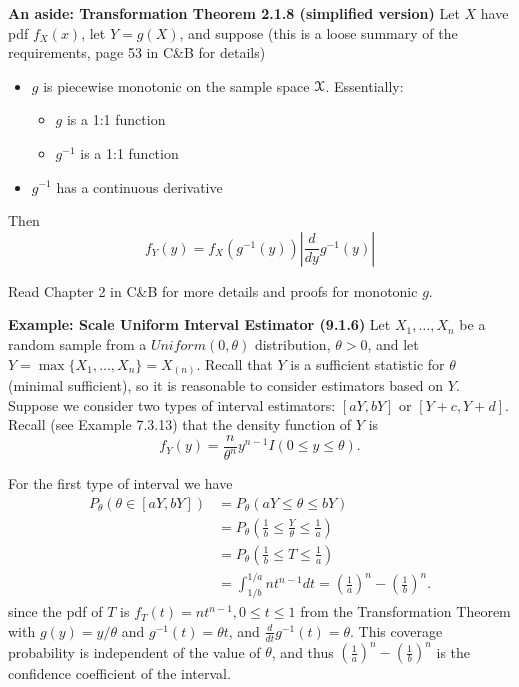 \documentclass[11pt,]{article}
\providecommand{\tightlist}{%
  \setlength{\itemsep}{0pt}\setlength{\parskip}{0pt}}
\newcommand{\Xndots}{X_1, \ldots, X_n}
\def\Xsc{{\cal X}}
\begin{document}
\textbf{An aside: Transformation Theorem 2.1.8 (simplified version)} Let
\(X\) have pdf \(f_X(x)\), let \(Y=g(X)\), and suppose (this is a loose
summary of the requirements, page 53 in C\&B for details)

\begin{itemize}
\tightlist
\item
  \(g\) is piecewise monotonic on the sample space \(\Xsc\).
  Essentially:

  \begin{itemize}
  \tightlist
  \item
    \(g\) is a 1:1 function
  \item
    \(g^{-1}\) is a 1:1 function
  \end{itemize}
\item
  \(g^{-1}\) has a continuous derivative
\end{itemize}

Then \[f_Y(y) = f_X(g^{-1}(y))\left| \frac{d}{dy} g^{-1}(y)\right|\]

Read Chapter 2 in C\&B for more details and proofs for monotonic \(g\).

\textbf{Example: Scale Uniform Interval Estimator (9.1.6)} Let
\(\Xndots\) be a random sample from a \(Uniform(0,\theta)\)
distribution, \(\theta>0\), and let \(Y= \max\{\Xndots\} = X_{(n)}\).
Recall that \(Y\) is a sufficient statistic for \(\theta\) (minimal
sufficient), so it is reasonable to consider estimators based on \(Y\).
Suppose we consider two types of interval estimators: \([aY, bY]\) or
\([Y+c, Y+d]\). Recall (see Example 7.3.13) that the density function of
\(Y\) is \[f_Y(y) = \frac{n}{\theta^n}y^{n-1} I( 0\leq y \leq \theta).\]

For the first type of interval we have \begin{align*}
P_\theta( \theta \in [aY,bY]) &= P_\theta(aY \leq \theta \leq bY)\\
&=P_\theta\left(\frac{1}{b} \leq \frac{Y}{\theta} \leq \frac{1}{a}\right)\\
&= P_\theta\left(\frac{1}{b} \leq T \leq \frac{1}{a}\right)\\
&= \int_{1/b}^{1/a} nt^{n-1}dt = \left(\frac{1}{a}\right)^n - \left(\frac{1}{b}\right)^{n}.
\end{align*} since the pdf of \(T\) is
\(f_T(t) = nt^{n-1}, 0 \leq t \leq 1\) from the Transformation Theorem
with \(g(y) = y/\theta\) and \(g^{-1}(t) = \theta t\), and
\(\frac{d}{dt} g^{-1}(t) = \theta\). This coverage probability is
independent of the value of \(\theta\), and thus
\(\left(\frac{1}{a}\right)^n - \left(\frac{1}{b}\right)^n\) is the
confidence coefficient of the interval.
\end{document}
